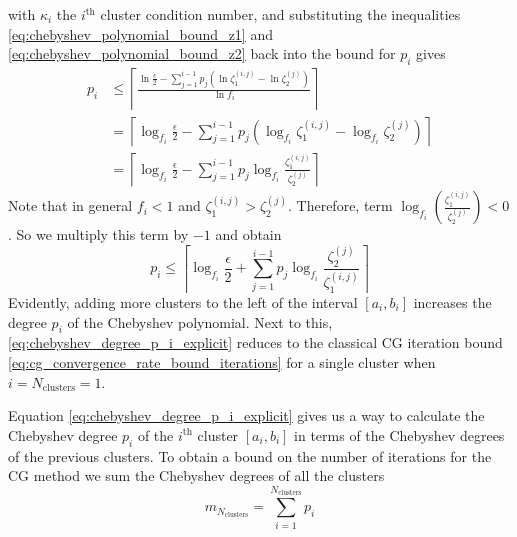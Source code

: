 with $\kappa_i$ the $i^{\text{th}}$ cluster condition number, and substituting the inequalities \ref{eq:chebyshev_polynomial_bound_z1} and \ref{eq:chebyshev_polynomial_bound_z2} back into the bound for $p_i$ gives
\begin{align*}
    p_i &\leq \left\lceil\frac{\ln{\frac{\epsilon}{2}} - \sum_{j=1}^{i-1} p_j\left(\ln{\zeta^{(i,j)}_1} - \ln{\zeta^{(j)}_2} \right)}{\ln{f_i}}\right\rceil \\
    &= \left\lceil\log_{f_i}{\frac{\epsilon}{2}} - \sum_{j=1}^{i-1} p_j\left(\log_{f_i}{\zeta^{(i,j)}_1} - \log_{f_i}{\zeta^{(j)}_2} \right)\right\rceil\\
    &= \left\lceil\log_{f_i}{\frac{\epsilon}{2}} - \sum_{j=1}^{i-1} p_j\log_{f_i}{\frac{\zeta^{(i,j)}_1}{\zeta^{(j)}_2}} \right\rceil
\end{align*}
Note that in general $f_i < 1$ and $\zeta^{(i,j)}_1 > \zeta^{(j)}_2$. Therefore, term $\log_{f_i}{\left(\frac{\zeta^{(i,j)}_1}{\zeta^{(j)}_2}\right)} < 0$. So we multiply this term by $-1$ and obtain
\begin{equation}
    p_i \leq \left\lceil\log_{f_i}{\frac{\epsilon}{2}} + \sum_{j=1}^{i-1} p_j\log_{f_i}{\frac{\zeta^{(j)}_2}{\zeta^{(i,j)}_1}} \right\rceil
    \label{eq:chebyshev_degree_p_i_explicit}
\end{equation}
Evidently, adding more clusters to the left of the interval $[a_i,b_i]$ increases the degree $p_i$ of the Chebyshev polynomial. Next to this, \cref{eq:chebyshev_degree_p_i_explicit} reduces to the classical CG iteration bound \cref{eq:cg_convergence_rate_bound_iterations} for a single cluster when $i = N_{\text{clusters}} = 1$.

Equation \ref{eq:chebyshev_degree_p_i_explicit} gives us a way to calculate the Chebyshev degree $p_i$ of the $i^{\text{th}}$ cluster $[a_i,b_i]$ in terms of the Chebyshev degrees of the previous clusters. To obtain a bound on the number of iterations for the CG method we sum the Chebyshev degrees of all the clusters
\begin{equation}
    m_{N_{\text{clusters}}} = \sum_{i=1}^{N_{\text{clusters}}} p_i
    \label{eq:cg_iteration_bound_multiple_clusters}
\end{equation}

